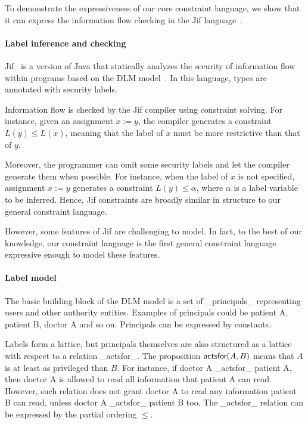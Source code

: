 To demonstrate the expressiveness of our core constraint language, we
show that it can express the information flow checking in 
the Jif language~\cite{jif}.

\paragraph{Label inference and checking}

Jif~\cite{jif} is a version of Java that statically analyzes the security of
information flow within programs based on the DLM model~\cite{ml-ifc-97}. In
this language, types are annotated with security labels.

Information flow is checked by the Jif compiler using constraint
solving. For instance, given an assignment $x := y$, the compiler
generates a constraint $L(y)\leq L(x)$, meaning that the
label of $x$ must be more restrictive than that of $y$.

Moreover, the programmer can omit some security labels and let the
compiler generate them when possible. For instance, when the label of
$x$ is not specified, assignment $x := y$ generates a constraint
$L(y)\leq \alpha$, where $\alpha$ is a label variable to be inferred.
Hence, Jif constraints are broadly similar in structure
to our general constraint language.

However, some features of Jif are challenging to model.  In fact, to
the best of our knowledge, our constraint language is the first
general constraint language expressive enough to model these features.

\paragraph{Label model}

The basic building block of the DLM model is a set of _principals_
representing users and other authority entities. Examples of
principals could be patient A, patient B, doctor A and so on.
Principals can be expressed by constants.

Labels form a lattice, but principals themselves are also structured
as a lattice with respect to a relation _actsfor_.  The proposition
$\textsf{actsfor}(A,B)$ means that $A$ is at least as privileged than
$B$.
% 
For instance, if doctor A _actsfor_ patient A, then doctor A is
allowed to read all information that patient A can read. However, such
relation does not grant doctor A to read any information patient B can
read, unless doctor A _actsfor_ patient B too. The _actsfor_ relation
can be expressed by the partial ordering $\leq$.

